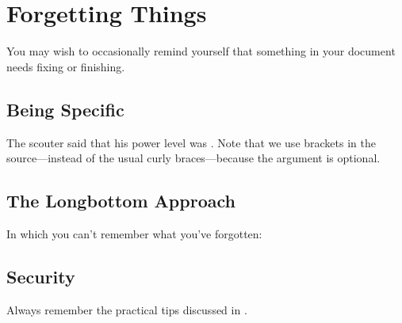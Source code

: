 \section{Forgetting Things}

You may wish to occasionally remind yourself that something in your document needs fixing or finishing.

\subsection{Being Specific}

The scouter said that his power level was \get[what?]. Note that we use brackets in the source---instead of the usual curly braces---because the argument is optional.

\subsection{The Longbottom Approach}

In which you can't remember what you've forgotten:

\get

\subsection{Security}

Always remember the practical tips discussed in .
